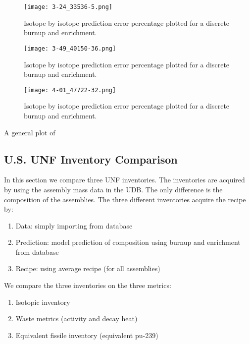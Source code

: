 \begin{figure}
    \centering
    \texttt{[image: 3-24\_33536-5.png]}
    \caption{Isotope by isotope prediction error percentage
             plotted for a discrete burnup and enrichment.
             }
    \label{fig:324_33536}
\end{figure}



\begin{figure}
    \centering
    \texttt{[image: 3-49\_40150-36.png]}
    \caption{Isotope by isotope prediction error percentage
             plotted for a discrete burnup and enrichment.
             }
    \label{fig:349_40150}
\end{figure}


\begin{figure}
    \centering
    \texttt{[image: 4-01\_47722-32.png]}
    \caption{Isotope by isotope prediction error percentage
             plotted for a discrete burnup and enrichment.
             }
    \label{fig:401_47722}
\end{figure}

A general plot of 


\subsection{U.S. \gls{UNF} Inventory Comparison}

In this section we compare three \gls{UNF} inventories.
The inventories are acquired by using the assembly mass data
in the \gls{UDB}. The only difference is the composition of the
assemblies. The three different inventories acquire the recipe by:
\begin{enumerate}
    \item Data: simply importing from database
    \item Prediction: model prediction of composition using burnup and enrichment from database
    \item Recipe: using average recipe (for all assemblies)
\end{enumerate}

We compare the three inventories on the three
metrics:
\begin{enumerate}
    \item Isotopic inventory
    \item Waste metrics (activity and decay heat)
    \item Equivalent fissile inventory (equivalent pu-239)
\end{enumerate}

